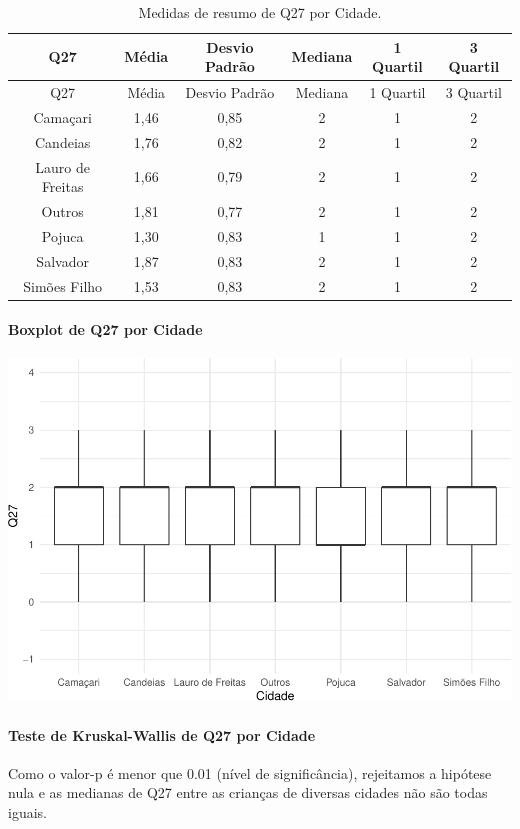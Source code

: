 \documentclass[]{article}
\let\oldparagraph\paragraph
\renewcommand{\paragraph}[1]{\oldparagraph{#1}\mbox{}}
\begin{document}
\begin{longtable}[]{@{}cccccc@{}}
\caption{\label{tab:unnamed-chunk-784}Medidas de resumo de Q27 por Cidade.}\tabularnewline
\toprule
Q27 & Média & Desvio Padrão & Mediana & 1 Quartil & 3 Quartil\tabularnewline
\midrule
\endfirsthead
\toprule
Q27 & Média & Desvio Padrão & Mediana & 1 Quartil & 3 Quartil\tabularnewline
\midrule
\endhead
Camaçari & 1,46 & 0,85 & 2 & 1 & 2\tabularnewline
Candeias & 1,76 & 0,82 & 2 & 1 & 2\tabularnewline
Lauro de Freitas & 1,66 & 0,79 & 2 & 1 & 2\tabularnewline
Outros & 1,81 & 0,77 & 2 & 1 & 2\tabularnewline
Pojuca & 1,30 & 0,83 & 1 & 1 & 2\tabularnewline
Salvador & 1,87 & 0,83 & 2 & 1 & 2\tabularnewline
Simões Filho & 1,53 & 0,83 & 2 & 1 & 2\tabularnewline
\bottomrule
\end{longtable}

\hypertarget{boxplot-de-q27-por-cidade}{%
\paragraph{Boxplot de Q27 por Cidade}\label{boxplot-de-q27-por-cidade}}

\begin{center}\includegraphics[width=0.75\linewidth]{relatorio_covid19_files/figure-latex/unnamed-chunk-785-1} \end{center}

\hypertarget{teste-de-kruskal-wallis-de-q27-por-cidade}{%
\paragraph{Teste de Kruskal-Wallis de Q27 por Cidade}\label{teste-de-kruskal-wallis-de-q27-por-cidade}}

Como o valor-p é menor que 0.01 (nível de significância), rejeitamos a hipótese nula e as medianas de Q27 entre as crianças de diversas cidades não são todas iguais.
\end{document}
